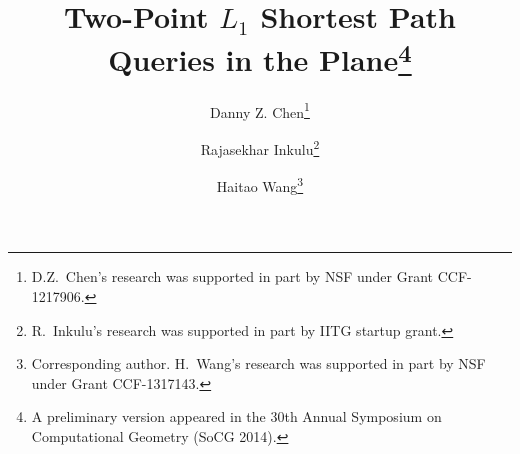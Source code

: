 \documentclass[english,runningheads,11pt]{llncs}
\begin{document}
\title{Two-Point $L_1$ Shortest Path Queries in the Plane\thanks{A preliminary version appeared in the 30th Annual
Symposium on Computational Geometry (SoCG 2014).}}

\author{Danny Z. Chen\thanks{D.Z.~Chen's research was supported in part by NSF
under Grant CCF-1217906.}
\and Rajasekhar Inkulu\thanks{R.~Inkulu's research was supported in part by IITG startup grant.}
\and
Haitao Wang\thanks{Corresponding author. H.~Wang's research was supported in part by NSF under Grant CCF-1317143.}
}


\maketitle

\setcounter{page}{1}
\end{document}
